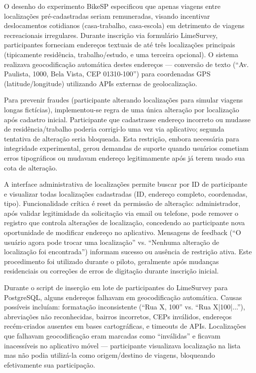 

O desenho do experimento BikeSP especificou que apenas viagens entre localizações pré-cadastradas seriam remuneradas, visando incentivar deslocamentos cotidianos (casa-trabalho, casa-escola) em detrimento de viagens recreacionais irregulares. Durante inscrição via formulário LimeSurvey, participantes forneciam endereços textuais de até três localizações principais (tipicamente residência, trabalho/estudo, e uma terceira opcional). O sistema realizava geocodificação automática destes endereços  --- conversão de texto (``Av. Paulista, 1000, Bela Vista, CEP 01310-100'') para coordenadas GPS (latitude/longitude) utilizando APIs externas de geolocalização.

Para prevenir fraudes (participante alterando localizações para simular viagens longas fictícias), implementou-se regra de uma única alteração por localização após cadastro inicial. Participante que cadastrasse endereço incorreto ou mudasse de residência/trabalho poderia corrigi-lo uma vez via aplicativo; segunda tentativa de alteração seria bloqueada. Esta restrição, embora necessária para integridade experimental, gerou demandas de suporte quando usuários cometiam erros tipográficos ou mudavam endereço legitimamente após já terem usado sua cota de alteração.

A interface administrativa de localizações permite buscar por ID de participante e visualizar todas localizações cadastradas (ID, endereço completo, coordenadas, tipo). Funcionalidade crítica é reset da permissão de alteração: administrador, após validar legitimidade da solicitação via email ou telefone, pode remover o registro que controla alterações de localização, concedendo ao participante nova oportunidade de modificar endereço no aplicativo. Mensagens de feedback (``O usuário agora pode trocar uma localização'' vs. ``Nenhuma alteração de localização foi encontrada'') informam sucesso ou ausência de restrição ativa. Este procedimento foi utilizado durante o piloto, geralmente após mudanças residenciais ou correções de erros de digitação durante inscrição inicial.

Durante o script de inserção em lote de participantes do LimeSurvey para PostgreSQL, alguns endereços falhavam em geocodificação automática. Causas possíveis incluíam: formatação inconsistente (``Rua X, 100'' vs. ``Rua X|100|...''), abreviações não reconhecidas, bairros incorretos, CEPs inválidos, endereços recém-criados ausentes em bases cartográficas, e timeouts de APIs. Localizações que falhavam geocodificação eram marcadas como ``inválidas'' e ficavam inacessíveis no aplicativo móvel ---  participante visualizava localização na lista mas não podia utilizá-la como origem/destino de viagens, bloqueando efetivamente sua participação.

